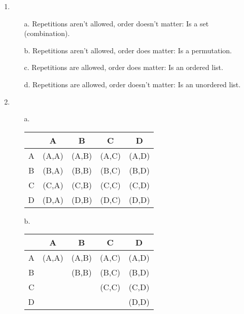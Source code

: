 
\newcommand{\laClass}       {CS 211}
\newcommand{\laSemester}    {Spring 2018}
\newcommand{\laChapter}     {5.1}
\newcommand{\laType}        {Exercise}
\newcommand{\laPoints}      {5}
\newcommand{\laTitle}       {Intro to Combinatorics}
\newcommand{\laDate}        {Jan 16, 2018}
\setcounter{chapter}{5}
\setcounter{section}{1}
\addtocounter{section}{-1}

\toggletrue{answerkey}





\begin{enumerate}
    \item
        \begin{itemize}
            \item[a.]   Repetitions aren't allowed, order doesn't matter: Is a set (combination).
            \item[b.]   Repetitions aren't allowed, order does matter: Is a permutation.
            \item[c.]   Repetitions are allowed, order does matter: Is an ordered list.
            \item[d.]   Repetitions are allowed, order doesn't matter: Is an unordered list.
        \end{itemize}
        
    \item
        \begin{itemize}
            \item[a.]   
                \begin{tabular}{c | c c c c}
                    & A & B & C & D \\ \hline
                    A & (A,A) & (A,B) & (A,C) & (A,D)
                    \\
                    B & (B,A) & (B,B) & (B,C) & (B,D)
                    \\
                    C & (C,A) & (C,B) & (C,C) & (C,D)
                    \\
                    D & (D,A) & (D,B) & (D,C) & (D,D)
                \end{tabular}
                
            \item[b.]   
                \begin{tabular}{c | c c c c}
                    & A & B & C & D \\ \hline
                    A & (A,A) & (A,B) & (A,C) & (A,D)
                    \\
                    B &  & (B,B) & (B,C) & (B,D)
                    \\
                    C &  &  & (C,C) & (C,D)
                    \\
                    D &  &  &  & (D,D)
                \end{tabular}
        \end{itemize}
        

\end{enumerate}
